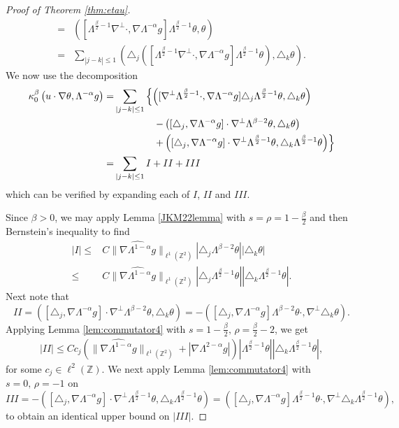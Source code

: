 \documentclass[twoside, reqno]{amsart}
\numberwithin{lemma}{section}
\numberwithin{theorem}{section}
\numberwithin{proposition}{section}
\numberwithin{equation}{section} %
\newcommand{\lpj}{\triangle_j}
\newcommand{\lpk}{\triangle_k}
\newcommand{\te}{\theta}
\newcommand{\la}{\Lambda}
\newcommand{\ka}{\kappa}
\newcommand{\lbn}{\left (}
\newcommand{\rbn}{\right )}
\newcommand{\Sob}[2]{\lVert#1\rVert_{#2}}
\newcommand{\ZZ}{\mathbb{Z}}
\newcommand{\al}{\alpha}
\newcommand{\be}{\beta}
\begin{document}
\begin{proof}[Proof of Theorem \ref{thm:etau}]
\begin{align*}
    =&\lbn [\la^{\frac{\be}{2}-1}\nabla^{\perp}\cdot, \nabla \la^{-\al}g]\la^{\frac{\be}{2}-1}\te,\te\rbn\\
    =& \sum_{|j-k|\le 1} \lbn \lpj ([\la^{\frac{\be}{2}-1}\nabla^{\perp}\cdot, \nabla \la^{-\al}g]\la^{\frac{\be}{2}-1}\te),\lpk \te\rbn.
\end{align*}
We now use the decomposition
\begin{align*}
      \ka_0^\be\lbn u\cdot \nabla \te, \la^{-\alpha}g \rbn=&\sum_{|j-k|\le 1}\left \{ \lbn [\nabla^{\perp}\la^{\frac{\be}{2}-1}\cdot,\nabla\la^{-\al}g]\lpj \la^{\frac{\be}{2}-1}\te,\lpk \te\rbn \right.\\& \hspace{4 em}  \left.-\lbn [\lpj,\nabla\la^{-\al}g]\cdot \nabla^{\perp} \la^{\be-2}\te,\lpk \te\rbn \right.\\& \hspace{4 em}  \left.  +\lbn [\lpj,\nabla\la^{-\al}g]\cdot \nabla^{\perp} \la^{\frac{\be}{2}-1}\te,\lpk \la^{\frac{\be}{2}-1}\te\rbn\right\}\\
      =&\sum_{|j-k|\le 1} I+II+III
\end{align*}
which can be verified by expanding each of $I$, $II$ and $III$.

Since $\be>0$, we may apply Lemma \ref{JKM22lemma} with $s=\rho=1-\frac{\be}{2}$ and then Bernstein's inequality to find
\begin{align*}
    |I|\le& C\|\widehat{\nabla \la^{1-\al}g}\|_{\ell^1(\ZZ^2)}
    |\lpj\la^{\be-2}\te||\lpk\te|\\
    \le&C\|\widehat{\nabla \la^{1-\al}g}\|_{\ell^1(\ZZ^2)}|\lpj\la^{\frac{\be}{2}-1}\te||\lpk \la^{\frac{\be}{2}-1}\te|.
\end{align*}
Next note that 
\[II=\lbn [\lpj,\nabla\la^{-\al}g]\cdot \nabla^{\perp} \la^{\be-2}\te,\lpk \te\rbn =-\lbn [\lpj,\nabla\la^{-\al}g] \la^{\be-2}\te \cdot,\nabla^{\perp}\lpk \te\rbn. \]
Applying Lemma \ref{lem:commutator4} with $s=1-\frac{\be}{2},\, \rho=\frac{\be}{2}-2$, we get
\begin{align*}
    |II|\le Cc_j \left(\Sob{ \widehat{\nabla \la^{1-\al}g}}{\ell^1(\ZZ^2)}+|\nabla \la^{2-\al}g|\right)|\la^{\frac{\be}{2}-1}\te||\lpk \la^{\frac{\be}{2}-1}\te|,
\end{align*}
{for some $c_j \in \ell^{2}(\mathbb{Z})$}. We next apply Lemma \ref{lem:commutator4} with $s=0,\, \rho=-1$ on
\[III=-\lbn [\lpj,\nabla\la^{-\al}g]\cdot \nabla^{\perp} \la^{\frac{\be}{2}-1}\te,\lpk \la^{\frac{\be}{2}-1}\te\rbn =\lbn [\lpj,\nabla\la^{-\al}g] \la^{\frac{\be}{2}-1}\te \cdot,\nabla^{\perp}\lpk \la^{\frac{\be}{2}-1}\te\rbn,\]
to obtain an identical upper bound on $|III|$.


\end{proof}
\end{document}
